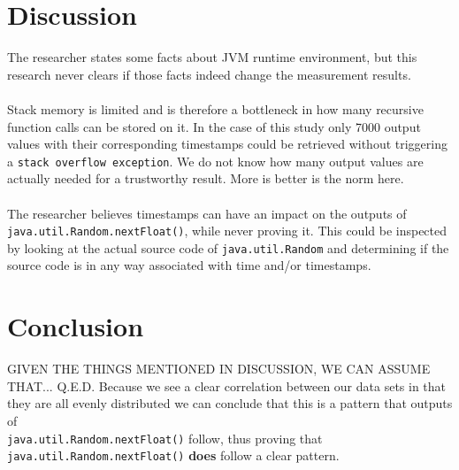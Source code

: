 \documentclass[
10pt, %
a4paper, %
oneside, %
headinclude,footinclude, %
BCOR5mm, %
]{scrartcl}
\begin{document}

\section{Discussion}

The researcher states some facts about JVM runtime environment, but this research never clears if those facts indeed change the measurement results.
\\
\\
Stack memory is limited and is therefore a bottleneck in how many recursive function calls can be stored on it. In the case of this study only 7000 output values with their corresponding timestamps could be retrieved without triggering a \texttt{stack overflow exception}. We do not know how many output values are actually needed for a trustworthy result. More is better is the norm here.
\\
\\
The researcher believes timestamps can have an impact on the outputs of\\ \texttt{java.util.Random.nextFloat()}, while never proving it. This could be inspected by looking at the actual source code of \texttt{java.util.Random} and determining if the source code is in any way associated with time and/or timestamps.


\section{Conclusion}

GIVEN THE THINGS MENTIONED IN DISCUSSION, WE CAN ASSUME THAT...
Q.E.D. Because we see a clear correlation between our data sets in that they are all evenly distributed we can conclude that this is a pattern that outputs of \\\texttt{java.util.Random.nextFloat()} follow, thus proving that \texttt{java.util.Random.nextFloat()} \textbf{does} follow a clear pattern.
\end{document}
